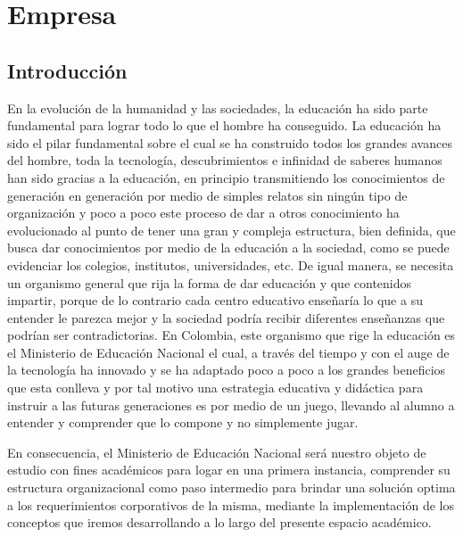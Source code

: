 \chapter{Empresa}
\section{Introducción}
En la evolución de la humanidad y las sociedades, la educación ha sido parte fundamental para lograr todo lo que el hombre ha conseguido. La educación ha sido el pilar fundamental sobre el cual se ha construido todos los grandes avances del hombre, toda la tecnología, descubrimientos e infinidad de saberes humanos han sido gracias a la educación, en principio transmitiendo los conocimientos de generación en generación por medio de simples relatos sin ningún tipo de organización y poco a poco este proceso de dar a otros conocimiento ha evolucionado al punto de tener una gran y compleja estructura, bien definida, que busca dar conocimientos por medio de la educación a la sociedad, como se puede evidenciar los colegios, institutos, universidades, etc. De igual manera, se necesita un organismo general que rija la forma de dar educación y que contenidos impartir, porque de lo contrario cada centro educativo enseñaría lo que a su entender le parezca mejor y la sociedad podría recibir diferentes enseñanzas que podrían ser contradictorias. En Colombia, este organismo que rige la educación es el Ministerio de Educación Nacional el cual, a través del tiempo y con el auge de la tecnología ha innovado y se ha adaptado poco a poco a los grandes beneficios que esta conlleva y por tal motivo una estrategia educativa y didáctica para instruir a las futuras generaciones es por medio de un juego, llevando al alumno a entender y comprender que lo compone y no simplemente jugar.

En consecuencia, el Ministerio de Educación Nacional será nuestro objeto de estudio con fines académicos para logar en una primera instancia, comprender su estructura organizacional como paso intermedio para brindar una solución optima a los requerimientos corporativos de la misma, mediante la implementación de los conceptos que iremos desarrollando a lo largo del presente espacio académico.


